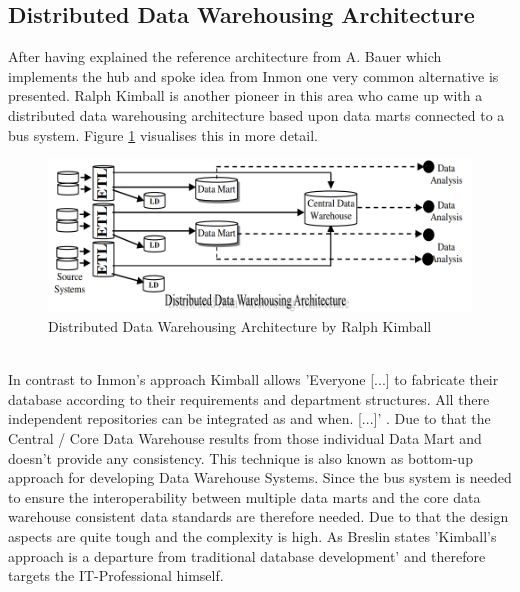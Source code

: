 \subsection{Distributed Data Warehousing Architecture}
After having explained the reference architecture from A. Bauer which implements the hub and spoke idea from Inmon one very common alternative is presented. Ralph Kimball is another pioneer in this area who came up with a distributed data warehousing architecture based upon data marts connected to a bus system. \cite{surveyDWSArchs} Figure \ref{fig:distributedWarehouseArchitecture} visualises this in more detail.
\begin{figure}[htb]
    \centering
    \includegraphics[scale=0.5]{pictures/DistributedDataWarehouseArchitecture.PNG}
    \caption{Distributed Data Warehousing Architecture by Ralph Kimball \cite{surveyDWSArchs}}
    \label{fig:distributedWarehouseArchitecture}
\end{figure}
\\In contrast to Inmon's approach Kimball allows 'Everyone [...] to fabricate their database according to their requirements and department structures. All there independent repositories can be integrated as and when. [...]' \cite{surveyDWSArchs}. Due to that the Central / Core Data Warehouse results from those individual Data Mart and doesn't provide any consistency. This technique is also known as bottom-up approach for developing Data Warehouse Systems. Since the bus system is needed to ensure the interoperability between multiple data marts and the core data warehouse consistent data standards are therefore needed. Due to that the design aspects are quite tough and the complexity is high. \cite{KimbalVSInmon}\newline
As Breslin states 'Kimball's approach is a departure from traditional database development'\cite[p.~19]{KimbalVSInmon} and therefore targets the IT-Professional himself.\newline

